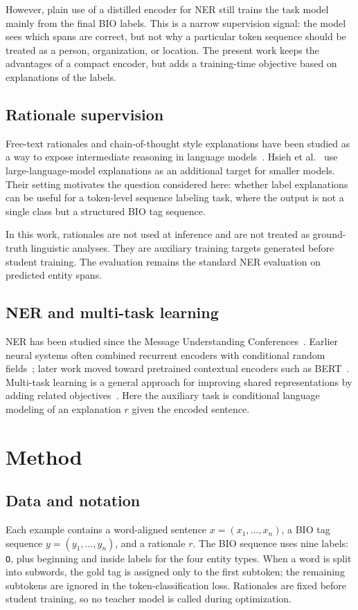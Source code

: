 \documentclass[a4paper,12pt]{extarticle}
\begin{document}
However, plain use of a distilled encoder for NER still trains the task model mainly from the final BIO labels. This is a narrow supervision signal: the model sees which spans are correct, but not why a particular token sequence should be treated as a person, organization, or location. The present work keeps the advantages of a compact encoder, but adds a training-time objective based on explanations of the labels.

\subsection{Rationale supervision}
Free-text rationales and chain-of-thought style explanations have been studied as a way to expose intermediate reasoning in language models~\cite{wei2022chain}. Hsieh et al.~\cite{hsieh2023distilling} use large-language-model explanations as an additional target for smaller models. Their setting motivates the question considered here: whether label explanations can be useful for a token-level sequence labeling task, where the output is not a single class but a structured BIO tag sequence.

In this work, rationales are not used at inference and are not treated as ground-truth linguistic analyses. They are auxiliary training targets generated before student training. The evaluation remains the standard NER evaluation on predicted entity spans.

\subsection{NER and multi-task learning}
NER has been studied since the Message Understanding Conferences~\cite{grishman1996message}. Earlier neural systems often combined recurrent encoders with conditional random fields~\cite{huang2015bidirectional}; later work moved toward pretrained contextual encoders such as BERT~\cite{devlin2018bert}. Multi-task learning is a general approach for improving shared representations by adding related objectives~\cite{caruana1997multitask,collobert2008unified}. Here the auxiliary task is conditional language modeling of an explanation $r$ given the encoded sentence.

\section{Method}
\label{sec:approach}

\subsection{Data and notation}
Each example contains a word-aligned sentence $x=(x_1,\ldots,x_n)$, a BIO tag sequence $y=(y_1,\ldots,y_n)$, and a rationale $r$. The BIO sequence uses nine labels: \texttt{O}, plus beginning and inside labels for the four entity types. When a word is split into subwords, the gold tag is assigned only to the first subtoken; the remaining subtokens are ignored in the token-classification loss. Rationales are fixed before student training, so no teacher model is called during optimization.
\end{document}
